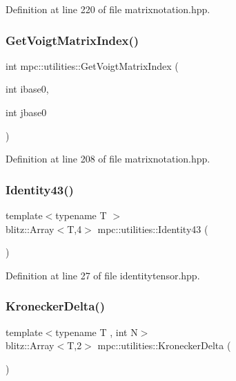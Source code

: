 Definition at line 220 of file matrixnotation.\+hpp.

\mbox{\label{namespacempc_1_1utilities_ab6036c49506f59bdc9d5e522df98f24a}} 
\subsubsection{\texorpdfstring{Get\+Voigt\+Matrix\+Index()}{GetVoigtMatrixIndex()}}
{\footnotesize\ttfamily int mpc\+::utilities\+::\+Get\+Voigt\+Matrix\+Index (\begin{DoxyParamCaption}\item[{int}]{ibase0,  }\item[{int}]{jbase0 }\end{DoxyParamCaption})\hspace{0.3cm}{\ttfamily [inline]}}



Definition at line 208 of file matrixnotation.\+hpp.

\mbox{\label{namespacempc_1_1utilities_a2a7788e9666343e76796346aa521fb4a}} 
\subsubsection{\texorpdfstring{Identity43()}{Identity43()}}
{\footnotesize\ttfamily template$<$typename T $>$ \\
blitz\+::\+Array$<$T,4$>$ mpc\+::utilities\+::\+Identity43 (\begin{DoxyParamCaption}{ }\end{DoxyParamCaption})}



Definition at line 27 of file identitytensor.\+hpp.

\mbox{\label{namespacempc_1_1utilities_aee39ac77e4aad3a854879829eed39b37}} 
\subsubsection{\texorpdfstring{Kronecker\+Delta()}{KroneckerDelta()}}
{\footnotesize\ttfamily template$<$typename T , int N$>$ \\
blitz\+::\+Array$<$T,2$>$ mpc\+::utilities\+::\+Kronecker\+Delta (\begin{DoxyParamCaption}{ }\end{DoxyParamCaption})}



